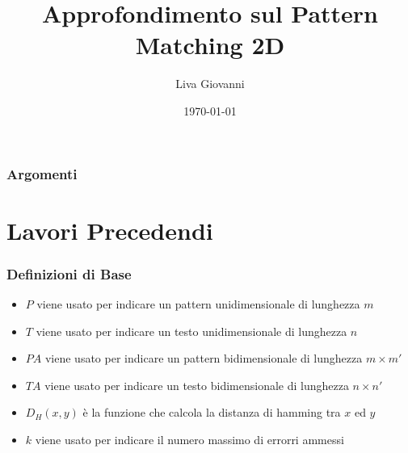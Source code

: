 \documentclass{beamer}
\title[Two-dimensional Pattern Matching]{Approfondimento sul Pattern Matching 2D} %
\author{Liva Giovanni} %
\institute[Udine] %
{
Università di Udine \\ %
\medskip
}
\date{\today} %
\begin{document}
\begin{frame}
\titlepage %
\end{frame}

\begin{frame}
\frametitle{Argomenti} %
\tableofcontents %
\end{frame}


\section{Lavori Precedendi}
\begin{frame}
\frametitle{Definizioni di Base}

\begin{definition}
\begin{itemize}
	\item $P$ viene usato per indicare un pattern unidimensionale di lunghezza $m$
	\item $T$ viene usato per indicare un testo unidimensionale di lunghezza $n$
	\item $PA$ viene usato per indicare un pattern bidimensionale di lunghezza $m\times m'$			\item $TA$ viene usato per indicare un testo bidimensionale di lunghezza $n \times n'$
	\item $D_H(x,y)$ è la funzione che calcola la distanza di hamming tra $x$ ed $y$
	\item $k$ viene usato per indicare il numero massimo di errorri ammessi
\end{itemize}	
\end{definition}
\end{frame}
\end{document}
